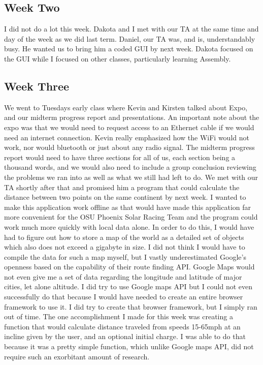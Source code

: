\begin{singlespace}
\subsection{Week Two}
I did not do a lot this week.
Dakota and I met with our TA at the same time and day of the week as we did last term.
Daniel, our TA was, and is, understandably busy.
He wanted us to bring him a coded GUI by next week.
Dakota focused on the GUI while I focused on other classes, particularly learning Assembly.

\subsection{Week Three}
We went to Tuesdays early class where Kevin and Kirsten talked about Expo, and our midterm progress report and presentations.
An important note about the expo was that we would need to request access to an Ethernet cable if we would need an internet connection.
Kevin really emphasized how the WiFi would not work, nor would bluetooth or just about any radio signal.
The midterm progress report would need to have three sections for all of us, each section being a thousand words, and we would also need to include a group conclusion reviewing the problems we ran into as well as what we still had left to do.
We met with our TA shortly after that and promised him a program that could calculate the distance between two points on the same continent by next week.
I wanted to make this application work offline as that would have made this application far more convenient for the OSU Phoenix Solar Racing Team and the program could work much more quickly with local data alone.
In order to do this, I would have had to figure out how to store a map of the world as a detailed set of objects which also does not exceed a gigabyte in size.
I did not think I would have to compile the data for such a map myself, but I vastly underestimated Google's openness based on the capability of their route finding API.
Google Maps would not even give me a set of data regarding the longitude and latitude of major cities, let alone altitude.
I did try to use Google maps API but I could not even successfully do that because I would have needed to create an entire browser framework to use it.
I did try to create that browser framework, but I simply ran out of time.
The one accomplishment I made for this week was creating a function that would calculate distance traveled from speeds 15-65mph at an incline given by the user, and an optional initial charge.
I was able to do that because it was a pretty simple function, which unlike Google maps API, did not require such an exorbitant amount of research.


\end{singlespace}
